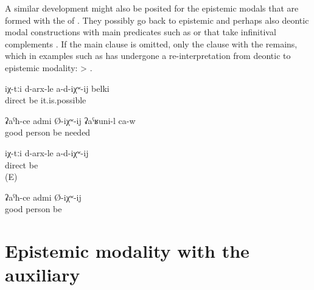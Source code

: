 A similar development might also be posited for the epistemic modals that are formed with the  of . They possibly go back to epistemic and perhaps also deontic modal constructions with main predicates such as   or   that take infinitival complements . If the main clause is omitted, only the clause with the  remains, which in examples such as  has undergone a re-interpretation from deontic to epistemic modality:   >  .
%
\begin{exe}
	\ex	\label{ex:Maybe they (= my thoughts) are not right}
	\gll	iχ-tːi	d-arx-le	a-d-iχʷ-ij	belki\\
			direct	be	it.is.possible\\
	\glt	{}

	\ex	\label{ex:He must be a good man / He should be a good man}
	\gll	ʡaˁħ-ce	admi	Ø-iχʷ-ij	ʡaˁʁuni-l	ca-w\\
		good	person	be	needed	\\
	\glt	{}

	\ex	\label{ex:They (= my thoughts) are probably not right}
	\gll	iχ-tːi	d-arx-le	a-d-iχʷ-ij\\
			direct	be\\
	\glt	{} (E)

	\ex	\label{ex:He is probably a good man}
	\gll	ʡaˁħ-ce	admi	Ø-iχʷ-ij\\
		good	person	be\\
	\glt	{}
\end{exe}



\section{Epistemic modality with the auxiliary \protect{} \protect{}}
\label{sec:Epistemic modality with the auxiliary b-urk find}

